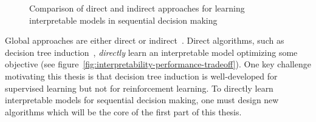 \begin{figure}
    \caption{Comparison of direct and indirect approaches for learning interpretable models in sequential decision making}
    \label{fig:direct-vs-indirect-methods}
\end{figure}

Global approaches are either direct or indirect~\cite{milani-survey}. 
Direct algorithms, such as decision tree induction~\cite{breiman1984classification}, \textit{directly} learn an interpretable model optimizing some objective (see figure~\ref{fig:interpretability-performance-tradeoff}).
One key challenge motivating this thesis is that decision tree induction is well-developed for supervised learning but not for reinforcement learning.
To directly learn interpretable models for sequential decision making, one must design new algorithms which will be the core of the first part of this thesis. 

